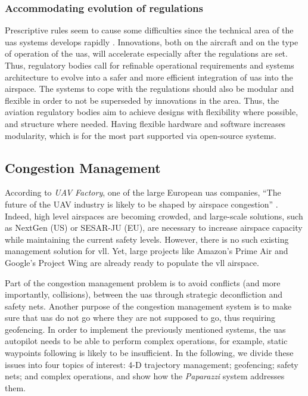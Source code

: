 \subsubsection{Accommodating evolution of regulations}
Prescriptive rules seem to cause some difficulties since the technical area of the \gls{uas} systems develops rapidly \cite{A_NPA_EASA2015}. Innovations, both on the aircraft and on the type of operation of the \gls{uas}, will accelerate especially after the regulations are set. Thus, regulatory bodies call for refinable operational requirements and systems architecture to evolve into a safer and more efficient integration of \gls{uas} into the airspace. The systems to cope with the regulations should also be modular and flexible in order to not be superseded by innovations in the area. 
Thus, the aviation regulatory bodies aim to achieve designs with flexibility where possible, and structure where needed. Having flexible hardware and software increases modularity, which is for the most part supported via open-source systems.

\subsection{Congestion Management}
According to \textit{UAV Factory}, one of the large European \gls{uas} companies, ``The future of the UAV industry is likely to be shaped by airspace congestion'' \cite{europe_report_civilian_drone}.
	Indeed, high level airspaces are becoming crowded, and large-scale solutions, such as NextGen (US) or SESAR-JU (EU), are necessary to increase airspace capacity while maintaining the current safety levels.
	However, there is no such existing management solution for \gls{vll}. Yet, large projects like Amazon's Prime Air and Google's Project Wing are already ready to populate the \gls{vll} airspace.	
	
	Part of the congestion management problem is to avoid conflicts (and more importantly, collisions), between the \gls{uas} through strategic deconfliction and safety nets.
	Another purpose of the congestion management system is to make sure that \gls{uas} do not go where they are not supposed to go, thus requiring geofencing.
	In order to implement the previously mentioned systems, the \gls{uas} autopilot needs to be able to perform complex operations, for example, static waypoints following is likely to be insufficient.
	In the following, we divide these issues into four topics of interest: 4-D trajectory management; geofencing; safety nets; and complex operations, and show how the \emph{Paparazzi} system addresses them.
	
